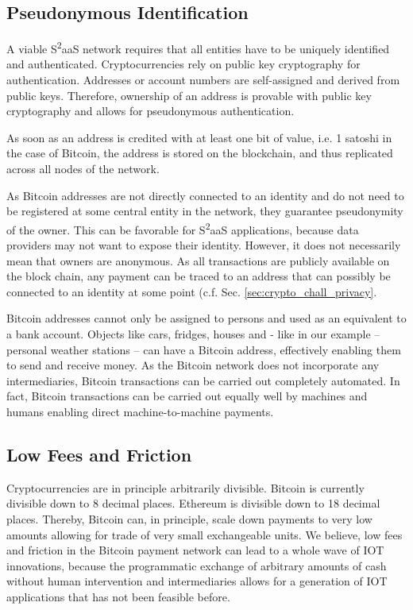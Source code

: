 \subsection{Pseudonymous Identification}

A viable S\textsuperscript{2}aaS network requires that all entities have  to be  uniquely  identified  and  authenticated. Cryptocurrencies rely on public key cryptography for authentication. Addresses or account numbers are self-assigned and derived from public keys. Therefore, ownership of an address is provable with public key cryptography and allows for pseudonymous authentication.

As soon as an address is credited with at least one bit of value, i.e. 1 satoshi in the case of Bitcoin, the address is stored on the blockchain, and thus replicated across all nodes of the network.

As Bitcoin addresses are not directly connected to an identity and do not need to be registered at some central entity in the network, they guarantee pseudonymity of the owner. This can be favorable for S\textsuperscript{2}aaS applications, because data providers may not want to expose their identity. However, it does not necessarily mean that owners are anonymous. As all transactions are publicly available on the block chain, any payment can be traced to an address that can possibly be connected to an identity at some point (c.f. Sec. \ref{sec:crypto_chall_privacy}.

Bitcoin addresses cannot only be assigned to persons and used as an equivalent to a bank account. Objects like cars, fridges, houses and - like in our example -- personal weather stations -- can have a Bitcoin address, effectively enabling them to send and receive money. As the Bitcoin network does not incorporate any intermediaries, Bitcoin transactions can be carried out completely automated. In fact, Bitcoin transactions can be carried out equally well by machines and humans enabling direct machine-to-machine payments.

\subsection{Low Fees and Friction}

Cryptocurrencies are in principle arbitrarily divisible. Bitcoin is currently divisible down to 8 decimal places. Ethereum is divisible down to 18 decimal places. 
Thereby, Bitcoin can, in principle, scale down payments to very low amounts allowing for trade of very small exchangeable units. We believe, low fees and friction in the Bitcoin payment network can lead to a whole wave of \ac{IOT} innovations, because the programmatic exchange of arbitrary amounts of cash without human intervention and intermediaries allows for a generation of \ac{IOT} applications that has not been feasible before.

